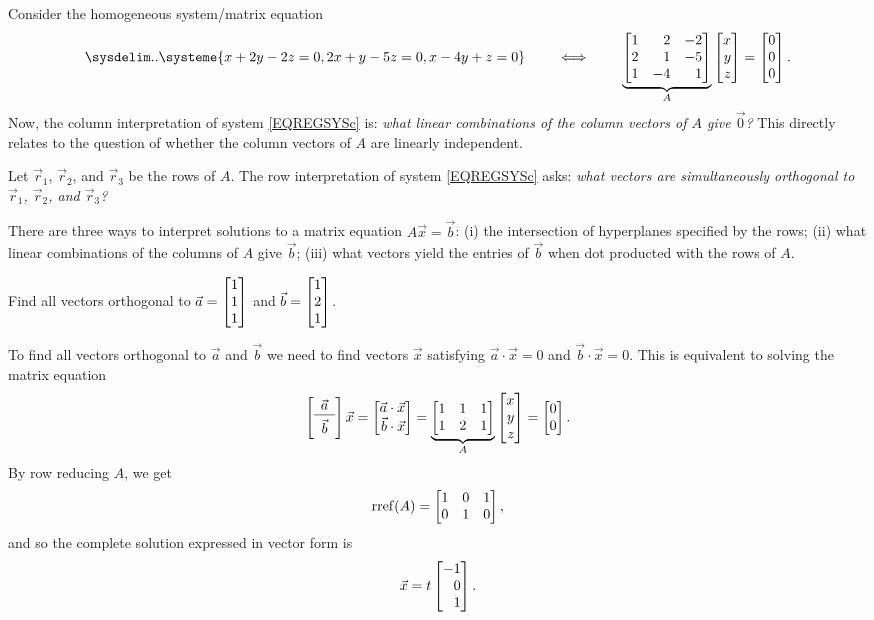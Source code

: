 Consider the homogeneous system/matrix equation
\begin{equation}
	\label{EQREGSYSc}
	\sysdelim..
		\systeme{
			x+2y-2z=0,
			2x+y-5z=0,
			x-4y+z=0
		}
		\qquad\iff\qquad
		\underbrace{\mat{1&2&-2\\2&1&-5\\1&-4&1}}_A\mat{x\\y\\z}=\mat{0\\0\\0}
		.
\end{equation}
Now, the column interpretation of system \eqref{EQREGSYSc} is: \emph{what linear combinations of the column vectors
of $A$ give $\vec 0$?} This directly relates to the question of whether the column vectors of $A$ are linearly independent.

Let $\vec r_1$, $\vec r_2$, and $\vec r_3$ be the rows of $A$. The row interpretation of system \eqref{EQREGSYSc} asks:
\emph{what vectors are simultaneously orthogonal to $\vec r_1$, $\vec r_2$, and $\vec r_3$?}

\begin{emphbox}[Takeaway]
	There are three ways to interpret solutions to a matrix equation $A\vec x=\vec b$: (i) the intersection of hyperplanes
	specified by the rows; (ii) what linear combinations of the columns of $A$ give $\vec b$; (iii) what vectors yield
	the entries of $\vec b$ when dot producted with the rows of $A$.
\end{emphbox}

\begin{example}
	Find all vectors orthogonal to $\vec a=\mat{1\\1\\1}$ and $\vec b=\mat{1\\2\\1}$.

	To find all vectors orthogonal to $\vec a$ and $\vec b$ we need to find vectors $\vec x$
	satisfying $\vec a\cdot \vec x=0$ and $\vec b\cdot \vec x=0$. This is equivalent to solving the matrix equation
	\[
		\left[\begin{array}{c}\vec a\\\hline\\[-1.5\medskipamount]\vec b\end{array}\right]\vec x
	=\mat{\vec a\cdot \vec x\\\vec b\cdot\vec x}
	=\underbrace{\mat{1&1&1\\1&2&1}}_A\mat{x\\y\\z}
	=\mat{0\\0}.
    \]
    By row reducing $A$, we get
    \[
        \Rref(A) = \mat{1&0&1\\0&1&0},
    \]
    and so the complete solution expressed in vector form is
    \[
        \vec x = t\mat{-1\\0\\1}.
    \]
\end{example}

